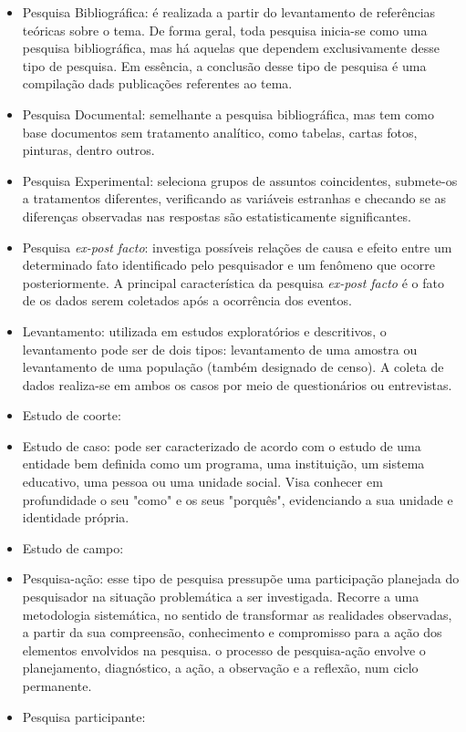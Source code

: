 \begin{itemize}
\item Pesquisa Bibliográfica: é realizada a partir do levantamento de referências teóricas sobre o tema. De forma geral, toda pesquisa inicia-se como uma pesquisa bibliográfica, mas há aquelas que dependem exclusivamente desse tipo de pesquisa. Em essência, a conclusão desse tipo de pesquisa é uma compilação dads publicações referentes ao tema. 

\item Pesquisa Documental: semelhante a pesquisa bibliográfica, mas tem como base documentos sem tratamento analítico, como tabelas, cartas fotos, pinturas, dentro outros. 

\item Pesquisa Experimental: seleciona grupos de assuntos coincidentes, submete-os a tratamentos diferentes, verificando as variáveis estranhas e checando se as diferenças observadas nas respostas são estatisticamente significantes.

\item Pesquisa \textit{ex-post facto}: investiga possíveis relações de causa e efeito entre um determinado fato identificado pelo pesquisador e um fenômeno que ocorre posteriormente. A principal característica da pesquisa \textit{ex-post facto} é o fato de os dados serem coletados após a ocorrência dos eventos.

\item Levantamento: utilizada em estudos exploratórios e descritivos, o levantamento pode ser de dois tipos: levantamento de uma amostra ou levantamento de uma população (também designado de censo). A coleta de dados realiza-se em ambos os casos por meio de questionários ou entrevistas.

\item Estudo de coorte: 

\item Estudo de caso: pode ser caracterizado de acordo com o estudo de uma entidade bem definida como um programa, uma instituição, um sistema educativo, uma pessoa ou uma unidade social. Visa conhecer em profundidade o seu "como" e os seus "porquês", evidenciando a sua unidade e identidade própria. 

\item Estudo de campo:

\item Pesquisa-ação: esse tipo de pesquisa pressupõe uma participação planejada do pesquisador na situação problemática a ser investigada. Recorre a uma metodologia sistemática, no sentido de transformar as realidades observadas, a partir da sua compreensão, conhecimento e compromisso para a ação dos elementos envolvidos na pesquisa. o processo de pesquisa-ação envolve o planejamento, diagnóstico, a ação, a observação e a reflexão, num ciclo permanente.

\item Pesquisa participante:

\end{itemize}

